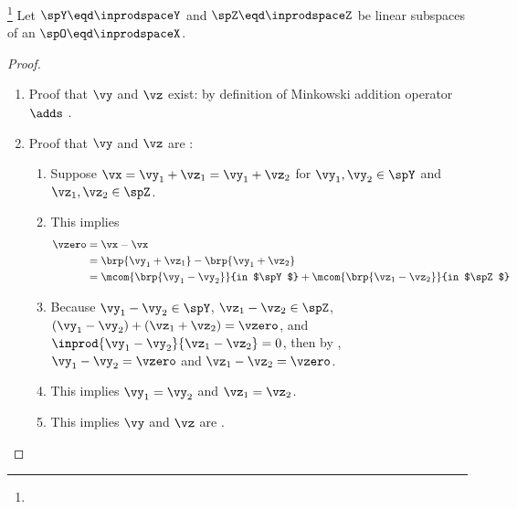 \begin{theorem}
\footnote{
  }
Let $\spY\eqd\inprodspaceY$ and $\spZ\eqd\inprodspaceZ$ be linear subspaces 
of an  $\spO\eqd\inprodspaceX$.
\end{theorem}
\begin{proof}
\begin{enumerate}
  \item Proof that $\vy$ and $\vz$ exist: by definition of Minkowski addition operator $\adds$ .
  \item Proof that $\vy$ and $\vz$ are :
    \begin{enumerate}
      \item Suppose $\vx=\vy_1+\vz_1=\vy_1+ \vz_2$ for $\vy_1,\vy_2\in\spY$ and $\vz_1,\vz_2\in\spZ$.
      \item This implies
        \begin{align*}
          \vzero
            &= \vx-\vx
          \\&= \brp{\vy_1+\vz_1} - \brp{\vy_1+ \vz_2}
          \\&= \mcom{\brp{\vy_1-\vy_2}}{in $\spY$} + \mcom{\brp{\vz_1- \vz_2}}{in $\spZ$}
        \end{align*}
      \item Because $\vy_1-\vy_2\in\spY$, $\vz_1-\vz_2\in\spZ$, 
                    $(\vy_1-\vy_2)+(\vz_1+\vz_2)=\vzero$, and 
                    $\inprod{\vy_1-\vy_2}{\vz_1-\vz_2}=0$,
            then by , $\vy_1-\vy_2=\vzero$ and $\vz_1-\vz_2=\vzero$.
      \item This implies $\vy_1=\vy_2$ and $\vz_1=\vz_2$.
      \item This implies $\vy$ and $\vz$ are .
    \end{enumerate}
\end{enumerate}
\end{proof}


